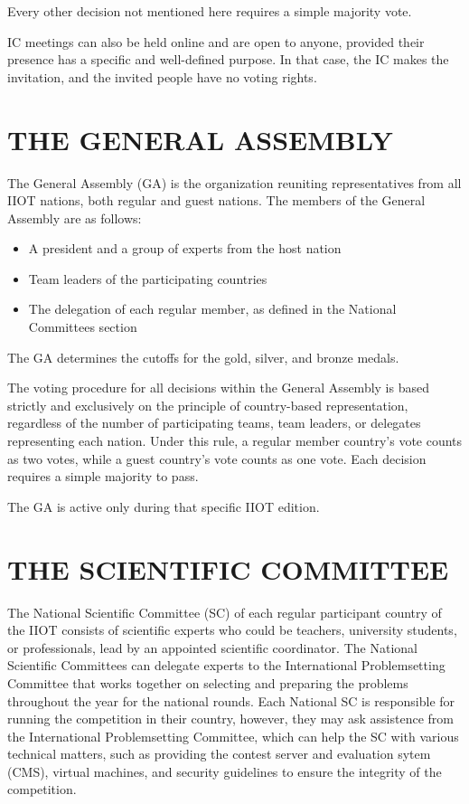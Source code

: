 \documentclass{article}
\begin{document}
Every other decision not mentioned here requires a simple majority vote.

IC meetings can also be held online and are open to anyone, provided their presence has a specific and well-defined purpose. In that case, the IC makes the invitation, and the invited people have no voting rights.

\section{THE GENERAL ASSEMBLY} 

The General Assembly (GA) is the organization reuniting representatives from all IIOT nations, both regular and guest nations. The members of the General Assembly are as follows:

\begin{itemize}
    \item A president and a group of experts from the host nation
    \item Team leaders of the participating countries
    \item The delegation of each regular member, as defined in the National Committees section
\end{itemize}

The GA determines the cutoffs for the gold, silver, and bronze medals.

The voting procedure for all decisions within the General Assembly is based strictly and exclusively on the principle of country-based representation, regardless of the number of participating teams, team leaders, or delegates representing each nation. Under this rule, a regular member country's vote counts as two votes, while a guest country's vote counts as one vote. Each decision requires a simple majority to pass.

The GA is active only during that specific IIOT edition.

\section{THE SCIENTIFIC COMMITTEE} 

The National Scientific Committee (SC) of each regular participant country of the IIOT consists of scientific experts who could be teachers, university students, or professionals, lead by an appointed scientific coordinator. The National Scientific Committees can delegate experts to the International Problemsetting Committee that works together on selecting and preparing the problems throughout the year for the national rounds. Each National SC is responsible for running the competition in their country, however, they may ask assistence from the International Problemsetting Committee, which can help the SC with various technical matters, such as providing the contest server and evaluation sytem (CMS), virtual machines, and security guidelines to ensure the integrity of the competition.  
\end{document}
